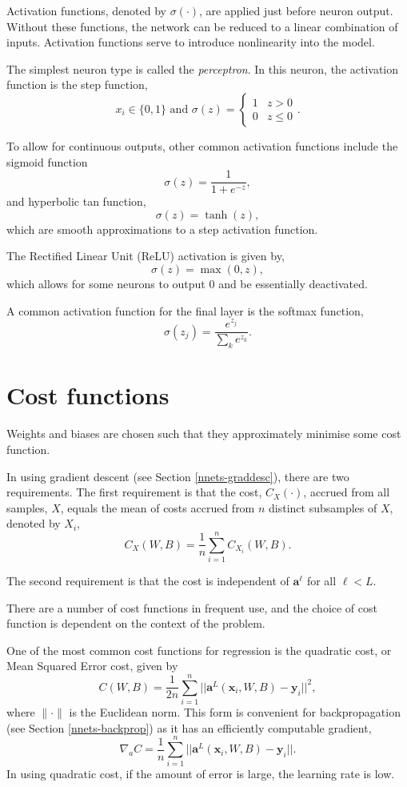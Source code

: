 Activation functions, denoted by $\sigma(\cdot)$, are applied just before neuron output. Without these functions, the network can be reduced to a linear combination of inputs. Activation functions serve to introduce nonlinearity into the model.

The simplest neuron type is called the \textit{perceptron}. In this neuron, the activation function is the step function,
\[
	x_i \in \{0,1\} \text{ and } \sigma(z) = \begin{cases}
		1 & z > 0 \\
		0 & z \le 0
	\end{cases}.
\]

To allow for continuous outputs, other common activation functions include the sigmoid function
\[
	\sigma(z) = \dfrac{1}{1+e^{-z}},
\]
and hyperbolic tan function,
\[
	\sigma(z) = \tanh(z),
\]
which are smooth approximations to a step activation function.

The Rectified Linear Unit (ReLU) activation is given by,
\[
	\sigma(z) = \max(0, z),
\]
which allows for some neurons to output 0 and be essentially deactivated.

A common activation function for the final layer is the softmax function,
\[
	\sigma(z_j) = \dfrac{e^{z_j}}{\sum_ke^{z_k}}.
\]

\section{Cost functions}\label{nnets-cost}

Weights and biases are chosen such that they approximately minimise some cost function.

In using gradient descent (see Section \ref{nnets-graddesc}), there are two requirements. The first requirement is that the cost, $C_X(\cdot)$, accrued from all samples, $X$, equals the mean of costs accrued from $n$ distinct subsamples of $X$, denoted by $X_i$,
\[
	C_X(W, B) = \dfrac{1}{n}\sum_{i=1}^n C_{X_i}(W,B).
\]

The second requirement is that the cost is independent of $\mathbf{a}^\ell$ for all $\ell < L$.

There are a number of cost functions in frequent use, and the choice of cost function is dependent on the context of the problem.

One of the most common cost functions for regression is the quadratic cost, or Mean Squared Error cost, given by
\[
	C(W,B) = \dfrac{1}{2n}\sum_{i=1}^n||\mathbf{a}^L(\mathbf{x}_i,W,B) - \mathbf{y}_i ||^2,
\]
where $\|\cdot\|$ is the Euclidean norm. This form is convenient for backpropagation (see Section \ref{nnets-backprop}) as it has an efficiently computable gradient,
\[
	\nabla_aC = \dfrac{1}{n}\sum_{i=1}^n||\mathbf{a}^L(\mathbf{x}_i,W,B) - \mathbf{y}_i ||.
\]
In using quadratic cost, if the amount of error is large, the learning rate is low.

